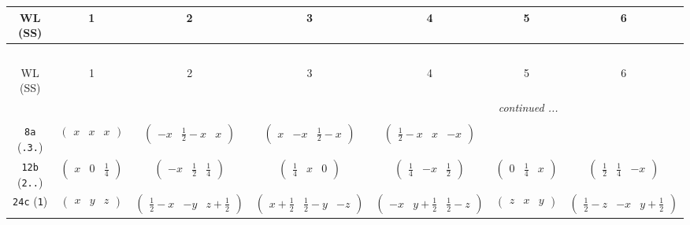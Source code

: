 \documentclass[fleqn,9pt,landscape]{jsarticle}
\begin{document}
\begin{center}
\renewcommand{\arraystretch}{1.2}
\begin{longtable}{ccccccc}
 \hline \hline
WL (SS) & 1 & 2 & 3 & 4 & 5 & 6 \\ \hline \endfirsthead

\multicolumn{6}{l}{\tablename\ \thetable{}} \\
 \hline \hline
WL (SS) & 1 & 2 & 3 & 4 & 5 & 6 \\ \hline \endhead

 \hline \hline
\multicolumn{6}{r}{\footnotesize\it continued ...} \\ \endfoot

 \hline \hline
\multicolumn{6}{r}{} \\ \endlastfoot

{\tt 8a} ({\tt .3.}) & $ \begin{pmatrix} x & x & x \end{pmatrix} $ & $ \begin{pmatrix} - x & \frac{1}{2} - x & x \end{pmatrix} $ & $ \begin{pmatrix} x & - x & \frac{1}{2} - x \end{pmatrix} $ & $ \begin{pmatrix} \frac{1}{2} - x & x & - x \end{pmatrix} $ & $  $ & $  $ \\ \hline
{\tt 12b} ({\tt 2..}) & $ \begin{pmatrix} x & 0 & \frac{1}{4} \end{pmatrix} $ & $ \begin{pmatrix} - x & \frac{1}{2} & \frac{1}{4} \end{pmatrix} $ & $ \begin{pmatrix} \frac{1}{4} & x & 0 \end{pmatrix} $ & $ \begin{pmatrix} \frac{1}{4} & - x & \frac{1}{2} \end{pmatrix} $ & $ \begin{pmatrix} 0 & \frac{1}{4} & x \end{pmatrix} $ & $ \begin{pmatrix} \frac{1}{2} & \frac{1}{4} & - x \end{pmatrix} $ \\ \hline
{\tt 24c} ({\tt 1}) & $ \begin{pmatrix} x & y & z \end{pmatrix} $ & $ \begin{pmatrix} \frac{1}{2} - x & - y & z + \frac{1}{2} \end{pmatrix} $ & $ \begin{pmatrix} x + \frac{1}{2} & \frac{1}{2} - y & - z \end{pmatrix} $ & $ \begin{pmatrix} - x & y + \frac{1}{2} & \frac{1}{2} - z \end{pmatrix} $ & $ \begin{pmatrix} z & x & y \end{pmatrix} $ & $ \begin{pmatrix} \frac{1}{2} - z & - x & y + \frac{1}{2} \end{pmatrix} $ \\

\end{longtable}
\end{center}
\end{document}
